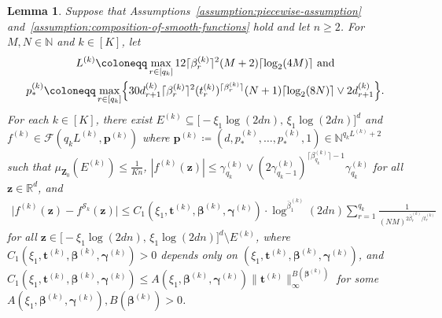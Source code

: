 \documentclass[12pt]{article}
\newtheorem{lemma}[thm]{Lemma}
\begin{document}
\begin{lemma} \label{lemma:approximate-composition-of-Holder-functions}
    Suppose that Assumptions~\ref{assumption:piecewise-assumption} and~\ref{assumption:composition-of-smooth-functions} hold and let $n\geq 2$. For $M,N\in\mathbb{N}$ and $k\in[K]$, let
    \begin{gather*}
    L^{(k)} \coloneqq \max_{r\in[q_k]} 12\lceil \beta^{(k)}_r \rceil^2(M+2)\lceil\log_2(4M)\rceil \text{ and}\\
    p^{(k)}_* \coloneqq \max_{r\in[q_k]} \Bigl\{ 30 d_{r+1}^{(k)}  \lceil\beta^{(k)}_r\rceil^2 (t^{(k)}_r)^{\lceil\beta^{(k)}_r\rceil} (N+1)\lceil\log_2(8N)\rceil \vee 2d_{r+1}^{(k)} \Bigr\}.
    \end{gather*}
    For each $k\in[K]$, there exist $E^{(k)} \subseteq \bigl[-\xi_1\log(2dn),\,\xi_1\log(2dn)\bigr]^d$ and $f^{(k)} \in \mathcal{F}(q_kL^{(k)}, \bm p^{(k)})$ where $\bm p^{(k)} \coloneqq (d, p^{(k)}_*,\ldots,p^{(k)}_*,1) \in \mathbb{N}^{q_kL^{(k)}+2}$ such that $\mu_{\bm Z_0}(E^{(k)}) \leq \frac{1}{Kn}$, $|f^{(k)}(\bm z)| \leq \gamma_{q_k}^{(k)} \vee (2\gamma_{q_k-1}^{(k)})^{\lceil\beta_{q_k}^{(k)}\rceil-1} \gamma_{q_k}^{(k)}$ for all $\bm z \in \mathbb{R}^d$, and
    \begin{align*}
        \bigl|f^{(k)}(\bm z) - f^{\mathcal{S}_k}(\bm z)\bigr| \leq C_1(\xi_1, \bm t^{(k)}, \bm \beta^{(k)}, \bm \gamma^{(k)}) \cdot \log^{\bar{\beta}_1^{(k)}} (2dn) \sum_{r=1}^{q_k} \frac{1}{(NM)^{2\bar{\beta}^{(k)}_r / t^{(k)}_r}}
    \end{align*}
    for all $\bm z\in \bigl[-\xi_1\log(2dn),\,\xi_1\log(2dn)\bigr]^d \setminus E^{(k)}$, where $C_1(\xi_1, \bm t^{(k)}, \bm \beta^{(k)}, \bm \gamma^{(k)}) > 0$ depends only on $(\xi_1, \bm t^{(k)}, \bm \beta^{(k)}, \bm \gamma^{(k)})$, and $C_1(\xi_1, \bm t^{(k)}, \bm \beta^{(k)}, \bm \gamma^{(k)}) \leq A(\xi_1,\bm \beta^{(k)}, \bm \gamma^{(k)})\|\bm t^{(k)}\|_\infty^{B(\bm \beta^{(k)})}$ for some $A(\xi_1,\bm \beta^{(k)}, \bm \gamma^{(k)}),B(\bm \beta^{(k)})  > 0$. 
\end{lemma}
\end{document}

